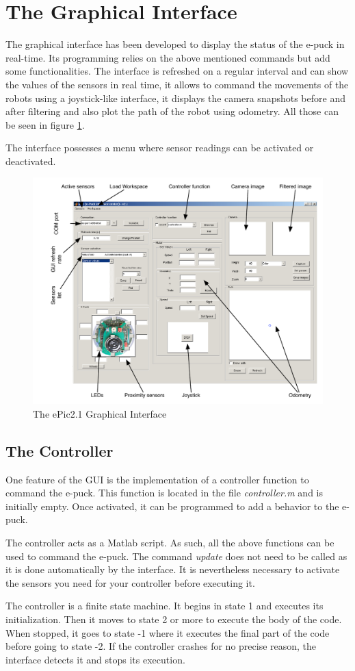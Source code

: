 \documentclass[11pt,oneside,english,a4paper]{article}
\begin{document}
\section{The Graphical Interface}
The graphical interface has been developed to display the status of the e-puck in real-time. Its programming relies on the above mentioned commands but add some functionalities. The interface is refreshed on a regular interval and can show the values of the sensors in real time, it allows to command the movements of the robots using a joystick-like interface, it displays the camera snapshots before and after filtering and also plot the path of the robot using odometry. All those can be seen in figure \ref{fig:epic}.
\par The interface possesses a menu where sensor readings can be activated or deactivated.

\begin{figure}[htb]
	\centering
		\includegraphics[width=1\textwidth]{ePic2.pdf}
	\caption{The ePic2.1 Graphical Interface\label{fig:epic}}
\end{figure}

\subsection{The Controller}
One feature of the GUI is the implementation of a controller function to command the e-puck. This function is located in the file \emph{controller.m} and is initially empty. Once activated, it can be programmed to add a behavior to the e-puck.
\par The controller acts as a Matlab script. As such, all the above functions can be used to command the e-puck. The command \emph{update} does not need to be called as it is done automatically by the interface. It is nevertheless necessary to activate the sensors you need for your controller before executing it.
\par The controller is a finite state machine. It begins in state 1 and executes its initialization. Then it moves to state 2 or more to execute the body of the code. When stopped, it goes to state -1 where it executes the final part of the code before going to state -2. If the controller crashes for no precise reason, the interface detects it and stops its execution.
\end{document}
